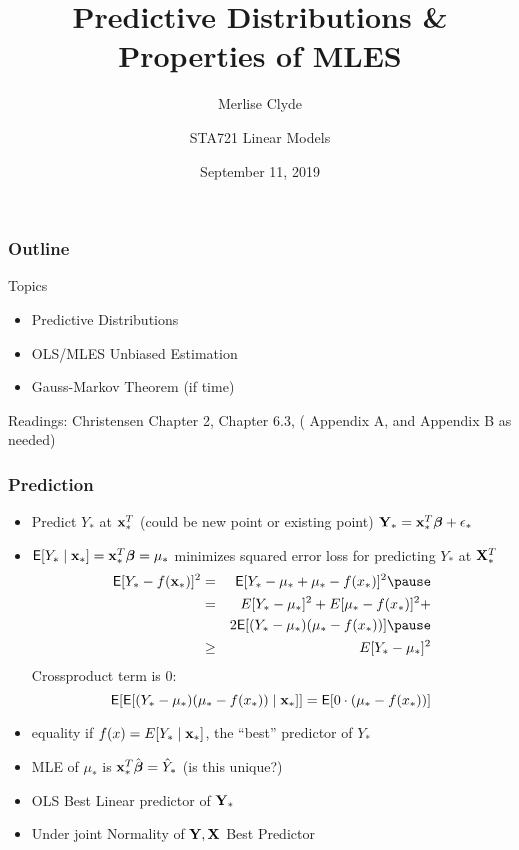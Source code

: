 \documentclass[handout]{beamer}\usepackage[]{graphicx}\usepackage[]{color}
\title{Predictive Distributions \& Properties of MLES}
\subtitle{Merlise Clyde}
\author{STA721 Linear Models}
\institute{Duke University}
\date{September 11, 2019}
\begin{document}
\maketitle

\begin{frame}\frametitle{Outline}
Topics
  \begin{itemize}
  \item Predictive Distributions
  \item OLS/MLES Unbiased Estimation
  \item Gauss-Markov Theorem  (if time)
  \end{itemize}


Readings: Christensen Chapter 2,  Chapter 6.3, ( Appendix A, and
Appendix B as needed)
\end{frame}

\begin{frame} \frametitle{Prediction}

  \begin{itemize}
  \item Predict $Y_*$ at $\mathbf{x}_*^T$   (could be new point or existing
    point) $\mathbf{Y}_* = \mathbf{x}_*^T \boldsymbol{\beta} + \epsilon_*$ \pause
 \item $\textsf{E}[Y_* \mid \mathbf{x}_*] = \mathbf{x}_*^{T} \boldsymbol{\beta} = \mu_*$ minimizes squared
   error loss for predicting $Y_*$ at $\mathbf{X}_*^T$ \pause
   \begin{eqnarray*}
     \E[Y_* - f(\x_*)]^2 & = & \E[Y_* - \mu_* + \mu_* - f(x_*)]^2
                               \pause \\
 & = & E[Y_* - \mu_*]^2 + E[\mu_* - f(x_*)]^2 + \\  &  & 2\E[( Y_* -
       \mu_*)(\mu_* - f(x_*))] \pause \\
 & \geq & E[Y_* - \mu_*]^2   \end{eqnarray*} \pause
Crossproduct term is 0:
$$\textsf{E}[\textsf{E}[( Y_* -
       \mu_*)(\mu_* - f(x_*))\mid \mathbf{x}_*]] = \textsf{E}[0 \cdot (\mu_* -
       f(x_*))]$$
\item equality if $f(x) = E[Y_* \mid \mathbf{x}_*]$,  the ``best'' predictor
  of $Y_*$ \pause
\item MLE of $\mu_*$ is $\mathbf{x}_*^{T} \hat{\boldsymbol{\beta}}  = \hat{Y}_*$ (is this
  unique?) \pause
\item OLS Best Linear predictor of $\mathbf{Y}_*$  \pause
\item Under joint Normality of $\mathbf{Y}, \mathbf{X}$  Best Predictor
  \end{itemize}
\end{frame}
\end{document}
